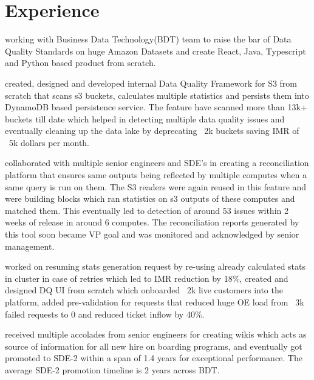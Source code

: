 \documentclass[]{deedy-resume-openfont}
\begin{document}
\begin{minipage}[t][0pt]{0.65\textwidth} 


\section{Experience}



\href{https://www.amazon.com}{}
\vspace{\topsep} %

\begin{tightemize}
\item working with Business Data Technology(BDT) team to raise the bar of Data Quality Standards on huge Amazon Datasets and create React, Java, Typescript and Python based product from scratch.
\item created, designed and developed internal Data Quality Framework for S3 from scratch that scans s3 buckets, calculates multiple statistics and persists them into DynamoDB based persistence service. The feature have scanned more than 13k+ buckets till date which helped in detecting multiple data quality issues and eventually cleaning up the data lake by deprecating ~2k buckets saving IMR of ~5k dollars per month.
\item collaborated with multiple senior engineers and SDE's in creating a reconciliation platform that ensures same outputs being reflected by multiple computes when a same query is run on them. The S3 readers were again reused in this feature and were building blocks which ran statistics on s3 outputs of these computes and matched them. This eventually led to detection of around 53 issues within 2 weeks of release in around 6 computes. The reconciliation reports generated by this tool soon became VP goal and was monitored and acknowledged by senior management.
\item worked on resuming stats generation request by re-using already calculated stats in cluster in case of retries which led to IMR reduction by 18\%, created and designed DQ UI from scratch which onboarded ~2k live customers into the platform, added pre-validation for requests that reduced huge OE load from ~3k failed requests to 0 and reduced ticket inflow by 40\%. 
\item received multiple accolades from senior engineers for creating wikis which acts as source of information for all new hire on boarding programs, and eventually got promoted to SDE-2 within a span of 1.4 years for exceptional performance. The average SDE-2 promotion timeline is 2 years across BDT.
\end{tightemize}
\sectionsep


\end{minipage}
\end{document}
